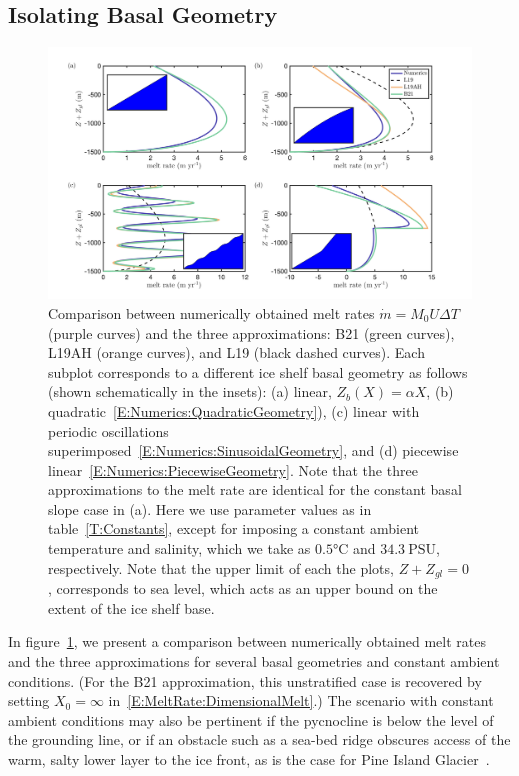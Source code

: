\documentclass[openacc]{rsproca_new}%
\begin{document}
\subsection{Isolating Basal Geometry}\label{S:Numerics:NoPycnocline}
\begin{figure}
\centering
\includegraphics[width = \textwidth]{Submitted_PRSA/make_plots/plots/figure6.png}
\caption{Comparison between numerically obtained melt rates $\dot{m}= M_0 U \Delta T$ (purple curves) and the three approximations: B21 (green curves), L19AH (orange curves), and L19 (black dashed curves). Each subplot corresponds to a different ice shelf basal geometry as follows (shown schematically in the insets): (a) linear, $Z_b(X) = \alpha X$, (b) quadratic~\eqref{E:Numerics:QuadraticGeometry}), (c) linear with periodic oscillations superimposed~\eqref{E:Numerics:SinusoidalGeometry}, and (d) piecewise linear~\eqref{E:Numerics:PiecewiseGeometry}. Note that the three approximations to the melt rate are identical for the constant basal slope case in (a).  Here we use parameter values as in table~\ref{T:Constants}, except for imposing a constant ambient temperature and salinity, which we take as $ 0.5\si{\celsius}$ and $34.3~\text{PSU}$, respectively. Note that the upper limit of each the plots, $Z + Z_{gl} = 0$, corresponds to sea level, which acts as an upper bound on the extent of the ice shelf base.}   \label{fig:Numerics:Geometry}
\end{figure}

In figure~\ref{fig:Numerics:Geometry}, we present a comparison between numerically obtained melt rates and the three approximations for several basal geometries and constant ambient conditions. (For the B21 approximation, this unstratified case is recovered by setting $X_0 = \infty$ in~\eqref{E:MeltRate:DimensionalMelt}.) The scenario with constant ambient conditions may also be pertinent if the pycnocline is below the level of the grounding line, or if an obstacle such as a sea-bed ridge obscures access of the warm, salty lower layer to the ice front, as is the case for Pine Island Glacier~\cite{DeRydt2014JGeophysResOceans, Bradley2021}. 
\end{document}
